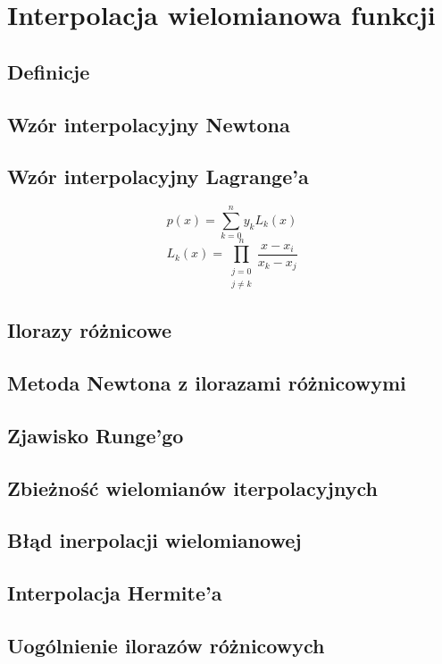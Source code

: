 \documentclass[../mn-notatki.tex]{subfiles}
\begin{document}
\section{Interpolacja wielomianowa funkcji}

\subsection{Definicje}
\begin{tcolorbox}
\end{tcolorbox}

\subsection{Wzór interpolacyjny Newtona}

\subsection{Wzór interpolacyjny Lagrange'a}
\begin{tcolorbox}
\[
p(x) = \sum_{k=0}^{n} y_k L_k(x)
\]
\[
L_k(x) = \prod_{\substack{j=0\\j\neq k}}^{n} \frac{x-x_i}{x_k-x_j}
\]
\end{tcolorbox}

\subsection{Ilorazy różnicowe}
\subsection{Metoda Newtona z ilorazami różnicowymi}
\subsection{Zjawisko Runge'go}
\subsection{Zbieżność wielomianów iterpolacyjnych}
\subsection{Błąd inerpolacji wielomianowej}
\subsection{Interpolacja Hermite'a}
\subsection{Uogólnienie ilorazów różnicowych}


\pagebreak
\end{document}
